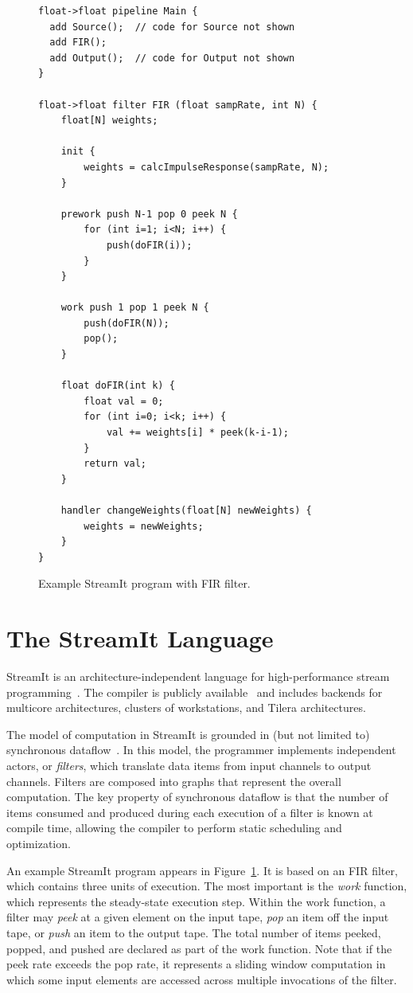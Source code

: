 \begin{figure}[t]
\eightpoint
\begin{verbatim}
float->float pipeline Main {
  add Source();  // code for Source not shown
  add FIR();
  add Output();  // code for Output not shown
}

float->float filter FIR (float sampRate, int N) {
    float[N] weights;

    init {
        weights = calcImpulseResponse(sampRate, N);
    }

    prework push N-1 pop 0 peek N {
        for (int i=1; i<N; i++) {
            push(doFIR(i));
        }
    }

    work push 1 pop 1 peek N {
        push(doFIR(N));
        pop();
    }

    float doFIR(int k) {
        float val = 0;
        for (int i=0; i<k; i++) {
            val += weights[i] * peek(k-i-1);
        }
        return val;
    }

    handler changeWeights(float[N] newWeights) {
        weights = newWeights;
    }
}
\end{verbatim}

\caption{Example StreamIt program with FIR filter.\protect\label{fig:fir-pipeline}}
\end{figure}

\section{The StreamIt Language}

StreamIt is an architecture-independent language for high-performance
stream programming~\cite{thies-cc02}.  The compiler is publicly
available~\cite{streamitweb} and includes backends for multicore
architectures, clusters of workstations, and Tilera architectures.

The model of computation in StreamIt is grounded in (but not limited
to) synchronous dataflow~\cite{lee87}.  In this model, the programmer
implements independent actors, or {\it filters}, which translate data
items from input channels to output channels.  Filters are composed
into graphs that represent the overall computation.  The key property
of synchronous dataflow is that the number of items consumed and
produced during each execution of a filter is known at compile time,
allowing the compiler to perform static scheduling and optimization.

An example StreamIt program appears in Figure~\ref{fig:fir-pipeline}.
It is based on an FIR filter, which contains three units of execution.
The most important is the {\it work} function, which represents the
steady-state execution step.  Within the work function, a filter may
{\it peek} at a given element on the input tape, {\it pop} an item off
the input tape, or {\it push} an item to the output tape.  The total
number of items peeked, popped, and pushed are declared as part of the
work function.  Note that if the peek rate exceeds the pop rate, it
represents a sliding window computation in which some input elements
are accessed across multiple invocations of the filter.

